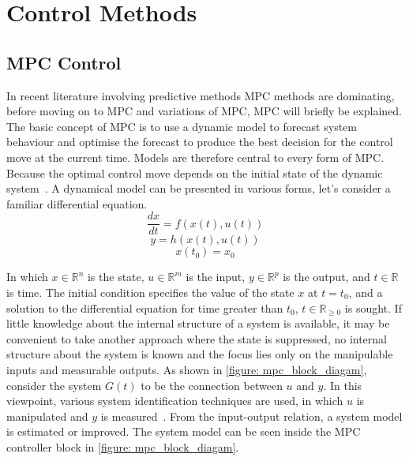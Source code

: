 \chapter{Control Methods}%
\label{chap:appendix_control_methods}

\section{\ac{MPC} Control}
In recent literature involving predictive methods \acf{MPC} methods are dominating, before moving on to \ac{MPC} and variations of \ac{MPC}, \ac{MPC} will briefly be explained.  The basic concept of \ac{MPC} is to use a dynamic model to forecast system behaviour and optimise the forecast to produce the best decision for the control move at the current time. Models are therefore central to every form of \ac{MPC}. Because the optimal control move depends on the initial state of the dynamic system~\cite{rawlings_model_2020}. A dynamical model can be presented in various forms, let's consider a familiar differential equation. 
$$ \frac{dx}{dt} = f(x(t), u(t)) $$
$$ y = h(x(t), u(t)) $$ 
$$ x(t_0) = x_0 $$

In which $x \in \mathbb{R}^n $ is the state, $u \in \mathbb{R}^m$ is the input, $y \in \mathbb{R}^p$ is the output, and $t \in \mathbb{R}$ is time. The initial condition specifies the value of the state $x$ at $t = t_0$, and a solution to the differential equation for time greater than $t_0$, $t \in \mathbb{R}_{\geq 0}$ is sought. If little knowledge about the internal structure of a system is available, it may be convenient to take another approach where the state is suppressed, no internal structure about the system is known and the focus lies only on the manipulable inputs and measurable outputs. As shown in \cref{figure: mpc_block_diagam}, consider the system $G(t)$ to be
the connection between $u$ and $y$. In this viewpoint, various system identification techniques are used, in which $u$ is manipulated and $y$ is measured~\cite{rawlings_model_2020}. From the input-output relation, a system model is estimated or improved. The system model can be seen inside the \ac{MPC} controller block in \cref{figure: mpc_block_diagam}.\\

